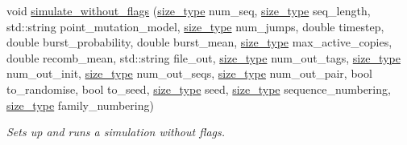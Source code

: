 \begin{DoxyCompactItemize}
void \hyperlink{namespaceretrocombinator_a0dc31e2b9d6473e995395d8171f56312}{simulate\+\_\+without\+\_\+flags} (\hyperlink{namespaceretrocombinator_a8e1541b50cee66a791df4c437ccbb385}{size\+\_\+type} num\+\_\+seq, \hyperlink{namespaceretrocombinator_a8e1541b50cee66a791df4c437ccbb385}{size\+\_\+type} seq\+\_\+length, std\+::string point\+\_\+mutation\+\_\+model, \hyperlink{namespaceretrocombinator_a8e1541b50cee66a791df4c437ccbb385}{size\+\_\+type} num\+\_\+jumps, double timestep, double burst\+\_\+probability, double burst\+\_\+mean, \hyperlink{namespaceretrocombinator_a8e1541b50cee66a791df4c437ccbb385}{size\+\_\+type} max\+\_\+active\+\_\+copies, double recomb\+\_\+mean, std\+::string file\+\_\+out, \hyperlink{namespaceretrocombinator_a8e1541b50cee66a791df4c437ccbb385}{size\+\_\+type} num\+\_\+out\+\_\+tags, \hyperlink{namespaceretrocombinator_a8e1541b50cee66a791df4c437ccbb385}{size\+\_\+type} num\+\_\+out\+\_\+init, \hyperlink{namespaceretrocombinator_a8e1541b50cee66a791df4c437ccbb385}{size\+\_\+type} num\+\_\+out\+\_\+seqs, \hyperlink{namespaceretrocombinator_a8e1541b50cee66a791df4c437ccbb385}{size\+\_\+type} num\+\_\+out\+\_\+pair, bool to\+\_\+randomise, bool to\+\_\+seed, \hyperlink{namespaceretrocombinator_a8e1541b50cee66a791df4c437ccbb385}{size\+\_\+type} seed, \hyperlink{namespaceretrocombinator_a8e1541b50cee66a791df4c437ccbb385}{size\+\_\+type} sequence\+\_\+numbering, \hyperlink{namespaceretrocombinator_a8e1541b50cee66a791df4c437ccbb385}{size\+\_\+type} family\+\_\+numbering)
\begin{DoxyCompactList}\small\item\em Sets up and runs a simulation without flags. \end{DoxyCompactList}\item 

\end{DoxyCompactItemize}
